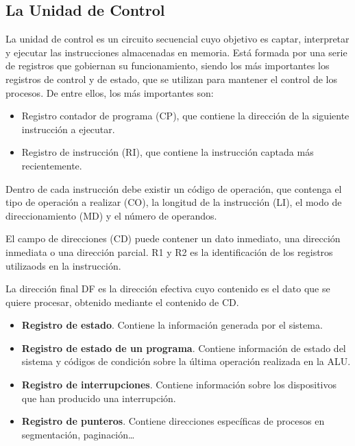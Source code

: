 \documentclass[a4paper, 11pt, titlepage]{article}
\begin{document}
    \subsection{La Unidad de Control}\label{unidadcontrol}

        La unidad de control es un circuito secuencial cuyo objetivo es captar, interpretar y ejecutar 
        las instrucciones almacenadas en memoria. Está formada por una serie de registros que gobiernan 
        su funcionamiento, siendo los más importantes los registros de control y de estado, que se utilizan 
        para mantener el control de los procesos. De entre ellos, los más importantes son:

        \begin{itemize}
            \item Registro contador de programa (CP), que contiene la dirección de la siguiente instrucción 
            a ejecutar.
            \item Registro de instrucción (RI), que contiene la instrucción captada más recientemente.
        \end{itemize}

        Dentro de cada instrucción debe existir un código de operación, que contenga el tipo de operación a 
        realizar (CO), la longitud de la instrucción (LI), el modo de direccionamiento (MD) y el número de 
        operandos.

        El campo de direcciones (CD) puede contener un dato inmediato, una dirección inmediata o una dirección 
        parcial. R1 y R2 es la identificación de los registros utilizaods en la instrucción.

        La dirección final DF es la dirección efectiva cuyo contenido es el dato que se quiere procesar, obtenido
        mediante el contenido de CD.

        \begin{itemize}
            \item \textbf{Registro de estado}. Contiene la información generada por el sistema.
            \item \textbf{Registro de estado de un programa}. Contiene información de estado del sistema y códigos 
            de condición sobre la última operación realizada en la ALU.
            \item \textbf{Registro de interrupciones}. Contiene información sobre los dispositivos que han producido 
            una interrupción.
            \item \textbf{Registro de punteros}. Contiene direcciones específicas de procesos en segmentación, paginación\dots
        \end{itemize}
\end{document}
